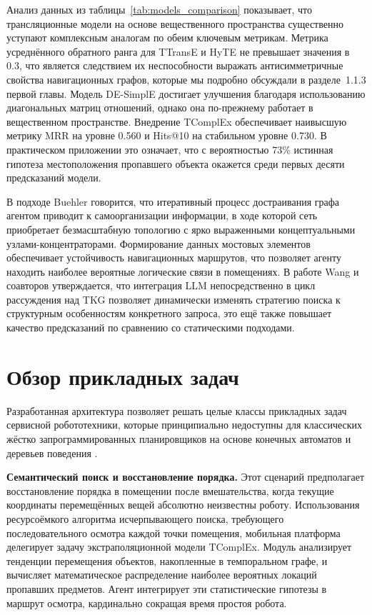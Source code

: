 Анализ данных из таблицы~\ref{tab:models_comparison} показывает, что трансляционные модели на основе вещественного пространства существенно уступают комплексным аналогам по обеим ключевым метрикам. Метрика усреднённого обратного ранга для TTransE и HyTE не превышает значения в 0.3, что является следствием их неспособности выражать антисимметричные свойства навигационных графов, которые мы подробно обсуждали в разделе~1.1.3 первой главы. Модель DE-SimplE достигает улучшения благодаря использованию диагональных матриц отношений, однако она по-прежнему работает в вещественном пространстве. Внедрение TComplEx обеспечивает наивысшую метрику MRR на уровне 0.560 и Hits@10 на стабильном уровне 0.730. В практическом приложении это означает, что с вероятностью 73\% истинная гипотеза местоположения пропавшего объекта окажется среди первых десяти предсказаний модели.

В подходе Buehler \cite{ref1} говорится, что итеративный процесс достраивания графа агентом приводит к самоорганизации информации, в ходе которой сеть приобретает безмасштабную топологию с ярко выраженными концептуальными узлами-концентраторами. Формирование данных мостовых элементов обеспечивает устойчивость навигационных маршрутов, что позволяет агенту находить наиболее вероятные логические связи в помещениях. В работе Wang и соавторов \cite{ref12} утверждается, что интеграция LLM непосредственно в цикл рассуждения над TKG позволяет динамически изменять стратегию поиска к структурным особенностям конкретного запроса, это ещё также повышает качество предсказаний по сравнению со статическими подходами.


\section{Обзор прикладных задач}
\label{sec:applications}

Разработанная архитектура позволяет решать целые классы прикладных задач сервисной робототехники, которые принципиально недоступны для классических жёстко запрограммированных планировщиков на основе конечных автоматов и деревьев поведения \cite{ref3}.

\textbf{Семантический поиск и восстановление порядка.} Этот сценарий предполагает восстановление порядка в помещении после вмешательства, когда текущие координаты перемещённых вещей абсолютно неизвестны роботу. Использования ресурсоёмкого алгоритма исчерпывающего поиска, требующего последовательного осмотра каждой точки помещения, мобильная платформа делегирует задачу экстраполяционной модели TComplEx. Модуль анализирует тенденции перемещения объектов, накопленные в темпоральном графе, и вычисляет математическое распределение наиболее вероятных локаций пропавших предметов. Агент интегрирует эти статистические гипотезы в маршрут осмотра, кардинально сокращая время простоя робота.

